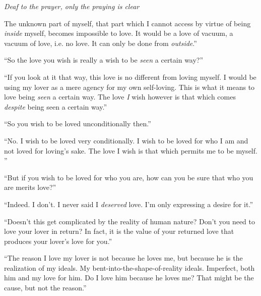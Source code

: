 \documentclass{article}
\begin{document}
\textit{Deaf to the prayer, only the praying is clear} \newline\newline

The unknown part of myself, that part which I cannot access by virtue of
being \textit{inside} myself, becomes impossible to love. It would be
a love of vacuum, a vacuum of love, i.e. no love. It can
only be done from \textit{outside}.'' \newline
\newline

``So the love you wish is really a wish to be \textit{seen} a certain
way?'' \newline
\newline

``If you look at it that way, this love is no different from loving
myself. I would be using my lover as a mere agency for my own
self-loving. This is what it means to love being \textit{seen} a certain
way. The love \textit{I} wish however is that which comes
\textit{despite} being seen a certain way.'' \newline
\newline

``So you wish to be loved unconditionally then.'' \newline
\newline

``No. I wish to be loved very conditionally. I wish to be loved for who
I am and not loved for loving's sake. The love I wish is that which
permits me to be myself. ''\newline
\newline

``But if you wish to be loved for who you are, how can you be sure that
who you are merits love?'' \newline
\newline

``Indeed. I don't. I never said I \textit{deserved} love. I'm only
expressing a desire for it.''\newline
\newline

``Doesn't this get complicated by the reality of human nature? Don't you
need to love your lover in return? In fact, it is the value of your
returned love that produces your lover's love for you.''\newline
\newline

``The reason I love my lover is not because he loves me, but because he
is the realization of my ideals. My bent-into-the-shape-of-reality
ideals. Imperfect, both him and my love for him. Do I love him because
he loves me? That might be the cause, but not the reason.'' \newline
\newline
\end{document}
